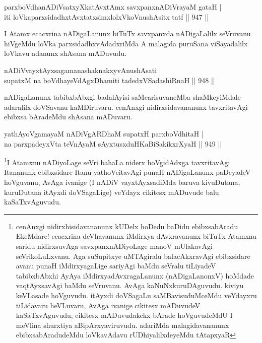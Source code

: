 \begin{shl}
parxboVdhanADiVsatxyXkatAvx\s \s tAmx savxpanxnADiVrayaM gataH | \\
iti loVkaparxsidadhxtAvxtatxsimxlolxVkoV\s nushAsitx tatf \hfill||  947 ||  
\end{shl}

\begin{artha}
I Atamx ecacxrina nADigaLanunx biTuTx savxpanxda nADigaLalilx seVruvanu hiVgeMdu loVka parxsidadhxvAdadxriMda A malagida puruSana viSayadalilx loVkavu adanunx shAsana mADuvudu.
\end{artha}


\begin{shl}
nADiVvayxtAyxsagamanashaknakxyvAnushAsati | \\
supatxM na boVdhayeVdAgxDhamiti tadedxVSadashiRnaH \hfill||  948 ||  
\end{shl}

\begin{artha}
nADigaLanunx tabibxbAbxgi badalAyisi saMcarisuvaneMba shaMkeyiMdale adaralilx doVSavanu kaMDiruvaru. cenAnxgi nidirxsidavananunx tavxritavAgi ebibxsa bAradeMdu shAsana mADuvaru.
\end{artha}


\begin{shl}
yathAyoVgamayaM nADiVgARDhaM supatxH parxboVdhitaH | \\
na parxpadeyxVta teVnAyaM sAyxtusxduHKaBiSakikxrXyaH \hfill||  949 ||   
\end{shl}

\begin{artha}
\footnote{cenAnxgi nidirxhisidavananunx kUDelx hoDedu baDidu ebibxsabAradu EkeMdare! ecacxrina deVhavanunx iMdirxya dAvxravanunx biTuTx Atamxnu saridu nidirxsuvAga savxpanxnADiyoLage manoV mUlakavAgi seVrikoLuLxvanu. Aga suSupitxye uMTAgiralu balacAkxravAgi ebibxsidare avanu punaH iMdirxyagaLige sariyAgi baMdu seVralu tiLiyadeV tabibxbAbxhi AyAya iMdirxyadAvxragaLanunx (nADigaLanonxV) hoMdade vaqtAyxsavAgi baMdu seVruvanu. AvAga kaNuNxkuruDAguvudu. kiviyu keVLasade hoVguvudu. itAyxdi doVSagaLu saMBavisuduMceMdu veYdayxru tiLidavaru heVLuvaru, AvAga ivanige cikitesx mADuvudeV kaSaTxvAguvudu, cikitesx mADuvudakekx bArade hoVguvudeMdU I meVlina shurxtiya aBipArxyaviruvudu. adariMda malagidavananunx ebibxsabAradudeMdu loVkavAdavu rUDhiyalilxdeyeMdu tAtapxyaR}I Atamxnu nADiyoLage seVri bahaLa niderx hoVgidAdxga tavxritavAgi Itananunx ebibxsidare Itanu yathoVcitavAgi punaH nADigaLanunx paDeyadeV hoVguvanu, AvAga ivanige (I nADiV vayxtAyxsadiMda baruva kivuDutana, kuruDutana itAyxdi doVSagaLige) veYdayx cikitesx mADuvude balu kaSaTxvAguvudu.
\end{artha}

